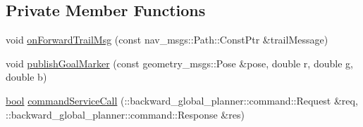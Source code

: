 \subsection*{Private Member Functions}
\begin{DoxyCompactItemize}
\item 
void \hyperlink{classcl__move__base__z_1_1backward__global__planner_1_1BackwardGlobalPlanner_a515bde5bfb3ae548f3e19209df1a48b0}{on\+Forward\+Trail\+Msg} (const nav\+\_\+msgs\+::\+Path\+::\+Const\+Ptr \&trail\+Message)
\item 
void \hyperlink{classcl__move__base__z_1_1backward__global__planner_1_1BackwardGlobalPlanner_a3c6784cad10fdadf28323380fe3d6d2b}{publish\+Goal\+Marker} (const geometry\+\_\+msgs\+::\+Pose \&pose, double r, double g, double b)
\item 
\hyperlink{classbool}{bool} \hyperlink{classcl__move__base__z_1_1backward__global__planner_1_1BackwardGlobalPlanner_a399a3dd0a3f8c781be06158e3238a5d9}{command\+Service\+Call} (\+::backward\+\_\+global\+\_\+planner\+::command\+::\+Request \&req, \+::backward\+\_\+global\+\_\+planner\+::command\+::\+Response \&res)
\end{DoxyCompactItemize}
